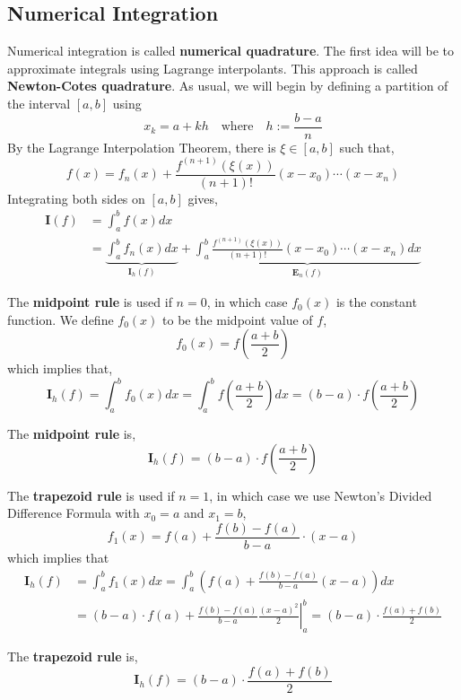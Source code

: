 \subsection{Numerical Integration}
Numerical integration is called \textbf{numerical quadrature}. The first idea will be to approximate integrals using Lagrange interpolants. This approach is called \textbf{Newton-Cotes quadrature}. As usual, we will begin by defining a partition of the interval $[a,b]$ using
\[x_k = a + kh \quad \text{where} \quad h := \frac{b-a}{n}\]
By the Lagrange Interpolation Theorem, there is $\xi \in [a, b]$ such that,
\[f(x)=f_n(x)+\frac{f^{(n+1)}(\xi(x))}{(n+1) !}\left(x-x_0\right) \cdots\left(x-x_n\right)\]
Integrating both sides on $[a, b]$ gives,
\begin{align*}
	\mathbf{I}(f) &= \int_a^b f(x) d x \\
	&=\underbrace{\int_a^b f_n(x) d x}_{\mathbf{I}_h(f)}+\underbrace{\int_a^b \frac{f^{(n+1)}(\xi(x))}{(n+1) !}\left(x-x_0\right) \cdots\left(x-x_n\right) d x}_{\mathbf{E}_n(f)}
\end{align*}

The \textbf{midpoint rule} is used if $n = 0$, in which case $f_0(x)$ is the constant function. We define $f_0(x)$ to be the midpoint value of $f$,
\[f_0(x)=f\left(\frac{a+b}{2}\right)\]
which implies that,
\[\mathbf{I}_h(f)=\int_a^b f_0(x) d x=\int_a^b f\left(\frac{a+b}{2}\right) d x=(b-a) \cdot f\left(\frac{a+b}{2}\right)\]

\begin{defn}
	The \textbf{midpoint rule} is,
	\[\mathbf{I}_h(f) = (b-a) \cdot f\left(\frac{a+b}{2}\right)\]
\end{defn}

\NewLine

The \textbf{trapezoid rule} is used if $n = 1$, in which case we use Newton's Divided Difference Formula with $x_0 = a$ and $x_1 = b$,
	\[f_1(x)=f(a)+\frac{f(b)-f(a)}{b-a} \cdot (x-a)\]
which implies that
	\begin{align*}
		\mathbf{I}_h(f) &= \int_a^b f_1(x) d x=\int_a^b\left(f(a)+\frac{f(b)-f(a)}{b-a}(x-a)\right) d x \\
		&= (b-a) \cdot f(a)+\left.\frac{f(b)-f(a)}{b-a} \frac{(x-a)^2}{2}\right|_a ^b=(b-a) \cdot \frac{f(a)+f(b)}{2}
	\end{align*}

\begin{defn}
	The \textbf{trapezoid rule} is,
	\[\mathbf{I}_h(f) = (b - a) \cdot \frac{f(a) + f(b)}{2}\]
\end{defn}

